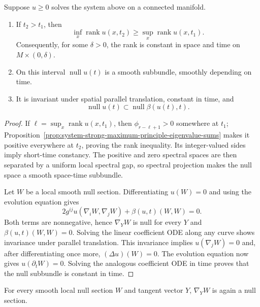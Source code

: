 \begin{theorem}
\label{thm:system-null-space-rigidity}
Suppose $u\geq0$ solves the system above on a connected manifold.
\begin{enumerate}
\item If $t_2>t_1$, then
\[
\inf_x\operatorname{rank}u(x,t_2)
\geq\sup_x\operatorname{rank}u(x,t_1).
\]
Consequently, for some $\delta>0$, the rank is constant in space and time on
$M\times(0,\delta)$.
\item On this interval $\operatorname{null}u(t)$ is a smooth subbundle,
smoothly depending on time.
\item It is invariant under spatial parallel translation, constant in time,
and
\[
\operatorname{null}u(t)\subset
\operatorname{null}\beta(u(t),t).
\]
\end{enumerate}
\end{theorem}

\begin{proof}
If $\ell=\sup_x\operatorname{rank}u(x,t_1)$, then
$\phi_{r-\ell+1}>0$ somewhere at $t_1$; Proposition~\ref{prop:system-strong-maximum-principle-eigenvalue-sums}
makes it positive everywhere at $t_2$, proving the rank inequality.  Its
integer-valued sides imply short-time constancy.  The positive and zero
spectral spaces are then separated by a uniform local spectral gap, so
spectral projection makes the null space a smooth space-time subbundle.

Let $W$ be a local smooth null section.  Differentiating $u(W)=0$ and using
the evolution equation gives
\[
2g^{ij}u(\nabla_iW,\nabla_jW)+\beta(u,t)(W,W)=0.
\]
Both terms are nonnegative, hence $\nabla_YW$ is null for every $Y$ and
$\beta(u,t)(W,W)=0$.  Solving the linear coefficient ODE along any curve
shows invariance under parallel translation.  This invariance implies
$u(\nabla_jW)=0$ and, after differentiating once more,
$(\Delta u)(W)=0$.  The evolution equation now gives
$u(\partial_tW)=0$.  Solving the analogous coefficient ODE in time proves
that the null subbundle is constant in time.
\end{proof}

\begin{remark}
\label{rem:null-space-infinitesimal-parallel-invariance}
For every smooth local null section $W$ and tangent vector $Y$,
$\nabla_YW$ is again a null section.
\end{remark}

